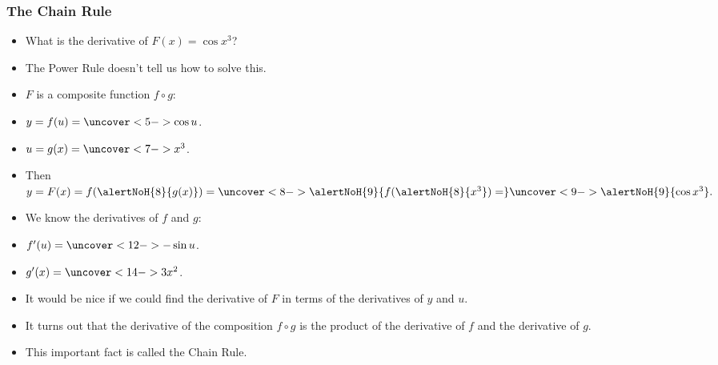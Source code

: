 \begin{frame}
\frametitle{The Chain Rule}
\begin{itemize}
\item  What is the derivative of $F(x) = \cos x^3$?
\item<2->  The Power Rule doesn't tell us how to solve this.
\item<3->  $F$ is a composite function $f\circ g$:
\item<3-| alert@4-5,9,11-12>  $y = f(u) = \uncover<5->{\cos u}$.
\item<3-| alert@6-8,13-14>  $u = g(x) = \uncover<7->{x^3}$.
\item<3->  Then $y = F(x) = f(\alertNoH{ 8}{g(x)}) = \uncover<8->{\alertNoH{ 9}{f(\alertNoH{ 8}{x^3}) =}}  \uncover<9->{\alertNoH{ 9}{\cos x^3}.}$
\item<10->  We know the derivatives of $f$ and $g$:
\item<10-| alert@11-12>  $f'(u) = \uncover<12->{-\sin u}$.
\item<10-| alert@13-14>  $g'(x) = \uncover<14->{3x^2}$.
\item<15->  It would be nice if we could find the derivative of $F$ in terms of the derivatives of $y$ and $u$.
\item<16->  It turns out that the derivative of the composition $f\circ g$ is the product of the derivative of $f$ and the derivative of $g$.
\item<17->  This important fact is called the Chain Rule.
\end{itemize}
\end{frame}

